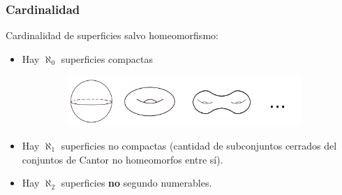 \documentclass{beamer}
\begin{document}
\begin{frame}
\frametitle{Cardinalidad}
Cardinalidad de superficies salvo homeomorfismo:
\begin{itemize}
\item Hay $\aleph_0$ superficies compactas
\begin{figure}[htb]
\begin{center}
\includegraphics[width=4in,height=0.75in]{imagenes/diapo4.png} 
\end{center}
\end{figure}

\item Hay $\aleph_1$ superficies no compactas (cantidad de subconjuntos cerrados del conjuntos de Cantor no homeomorfos entre sí).

\item  Hay $\aleph_2$ superficies \textbf{no} segundo numerables.
\end{itemize}



\end{frame}

 

 
 
 
 
\end{document}
